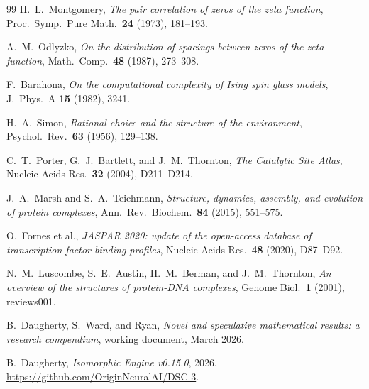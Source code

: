 \documentclass[11pt]{amsart}
\theoremstyle{definition}
\begin{document}
\begin{thebibliography}{99}
H.~L.~Montgomery, \emph{The pair correlation of zeros of the zeta function}, Proc.\ Symp.\ Pure Math.\ \textbf{24} (1973), 181--193.

A.~M.~Odlyzko, \emph{On the distribution of spacings between zeros of the zeta function}, Math.\ Comp.\ \textbf{48} (1987), 273--308.

F.~Barahona, \emph{On the computational complexity of Ising spin glass models}, J.\ Phys.\ A \textbf{15} (1982), 3241.

H.~A.~Simon, \emph{Rational choice and the structure of the environment}, Psychol.\ Rev.\ \textbf{63} (1956), 129--138.

C.~T.~Porter, G.~J.~Bartlett, and J.~M.~Thornton, \emph{The Catalytic Site Atlas}, Nucleic Acids Res.\ \textbf{32} (2004), D211--D214.

J.~A.~Marsh and S.~A.~Teichmann, \emph{Structure, dynamics, assembly, and evolution of protein complexes}, Ann.\ Rev.\ Biochem.\ \textbf{84} (2015), 551--575.

O.~Fornes et al., \emph{JASPAR 2020: update of the open-access database of transcription factor binding profiles}, Nucleic Acids Res.\ \textbf{48} (2020), D87--D92.

N.~M.~Luscombe, S.~E.~Austin, H.~M.~Berman, and J.~M.~Thornton, \emph{An overview of the structures of protein-DNA complexes}, Genome Biol.\ \textbf{1} (2001), reviews001.

B.~Daugherty, S.~Ward, and Ryan, \emph{Novel and speculative mathematical results: a research compendium}, working document, March 2026.

B.~Daugherty, \emph{Isomorphic Engine v0.15.0}, 2026. \url{https://github.com/OriginNeuralAI/DSC-3}.

\end{thebibliography}
\end{document}
